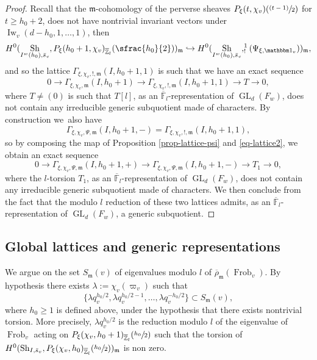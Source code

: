 \documentclass[JEP,XML,SOM,Unicode,published]{cedram}
\let\mathds\mathbbm
\newenvironment{enumeratea}
{\bgroup\def\theenumi{\alph{enumi}}\begin{enumerate}}
{\end{enumerate}\egroup}
\newcommand{\NoChangel}[1]{%
\expandafter\let\csname old\string#1\endcsname=#1
\let#1=\relax
\newcommand{#1}{\mathcode`l="716C\csname old\string#1\endcsname\mathcode`l="7160 }%
}
\def\hto{\mathrel{\lhook\joinrel\to}}
\newcommand{\psfrac}[2]{\sfrac{(#1)}{#2}}
\DeclareMathOperator{\GL}{GL}
\theoremstyle{plain}
\theoremstyle{definition}
\numberwithin{equation}{subsection}
\newcommand\Fm{{\mathbb F}}
\newcommand\Zm{{\mathbb Z}}
\DeclareMathOperator{\sh}{Sh}
\DeclareMathOperator{\Iw}{Iw}
\DeclareMathOperator{\frob}{Frob}
\DeclareMathOperator{\Fil}{Fil}\NoChangel{\Fil}
\begin{document}
\begin{enumeratea}
\begin{proof}
Recall that the $\mathfrak m$-cohomology of the perverse sheaves
$P_\xi(t,\chi_v)(\psfrac{t-1}{2})$
for $t \geq h_0+2$, does not have nontrivial invariant vectors under
$\Iw_v(d-h_0,1,\dots,1)$, then
\[
H^0(\sh_{I^w(h_0),\bar s_v},P_\xi(h_0+1,\chi_v)_{\overline \Zm_l}(\sfrac{h_0}{2}))_{\mathfrak m}
\hto H^0(\sh_{I^w(h_0),\bar s_v},\Fil^1_!(\Psi_{\xi,\mathds 1_v}))_{\mathfrak m},
\]
and so the lattice $\Gamma_{\xi,\chi_v,!,\mathfrak m}(I,h_0+1,1)$
is such that we have an exact sequence
\begin{equation} \label{eq-lattice2}
0 \to \Gamma_{\xi,\chi_v,\mathfrak m}(I,h_0+1)
\to \Gamma_{\xi,\chi_v,!,\mathfrak m}
(I,h_0+1,1) \to T \to 0,
\end{equation}
where $T \neq (0)$ is such that $T[l]$, as an $\overline \Fm_l$-representation of
$\GL_d(F_w)$, does not contain any
irreducible generic subquotient made of characters.
By construction we~also have
\[
\Gamma_{\xi,\chi_v,\Psi,\mathfrak m}(I,h_0+1,-)=
\Gamma_{\xi,\chi_v,!,\mathfrak m}(I,h_0+1,1),
\]
so by composing the map of Proposition \ref{prop-lattice-psi}
and \eqref{eq-lattice2}, we obtain an exact sequence
\[
0 \to \Gamma_{\xi,\chi_v,\Psi,\mathfrak m}(I,h_0+1,+) \to
\Gamma_{\xi,\chi_v,\Psi,\mathfrak m}(I,h_0+1,-) \to T_1 \to 0,
\]
where the $l$-torsion $T_1$, as an $\overline \Fm_l$-representation of
$\GL_d(F_w)$, does not contain any
irreducible generic subquotient made of characters. We then conclude from
the fact that the modulo
$l$ reduction of these two lattices admits, as an $\overline \Fm_l$-representation of
$\GL_d(F_w)$, a generic subquotient.
\end{proof}
\end{enumeratea}

\subsection{Global lattices and generic representations}
\label{para-final}

We argue on the set $S_{\mathfrak m}(v)$ of eigenvalues modulo $l$ of
$\overline \rho_{\mathfrak m}(\frob_v)$.
By hypothesis there exists $\lambda:=\chi_v(\varpi_v)$ such that
\[
\{\lambda q_v^{h_0/2},\lambda q_v^{h_0/2-1},\dots,\lambda q_v^{-h_0/2}\}
\subset S_{\mathfrak m}(v),
\]
where $h_0 \geq 1$ is defined above, under the hypothesis that there exists nontrivial torsion. More precisely, $\lambda q_v^{h_0/2}$ is the reduction modulo $l$
of the eigenvalue of $\frob_v$ acting on $P_\xi(\chi_v,h_0+1)_{\overline \Zm_l}(\sfrac{h_0}{2})$
such that the torsion of $H^0(\sh_{I,\bar s_v},P_\xi(\chi_v,h_0)_{\overline \Zm_l}(\sfrac{h_0}{2}))_{\mathfrak m}$
is non zero.
\end{document}
